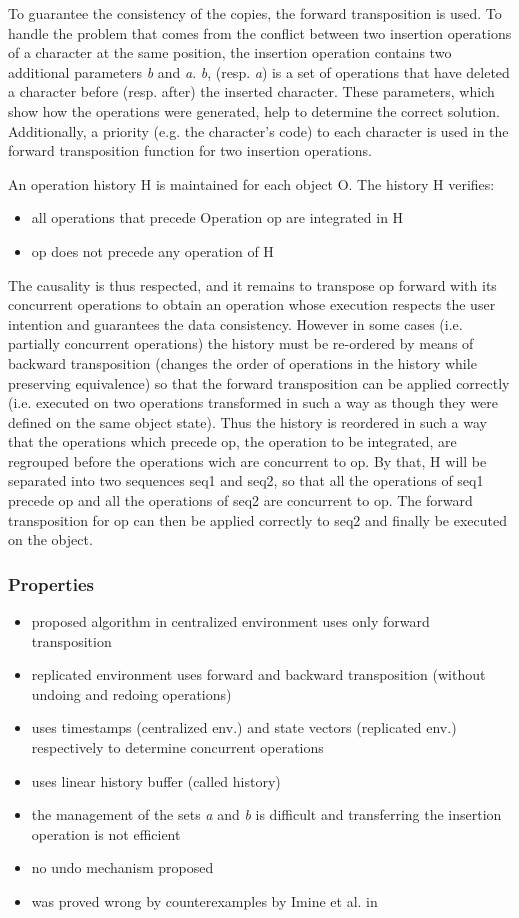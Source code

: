 To guarantee the consistency of the copies, the forward transposition is used. To handle the problem that comes from the conflict between two insertion operations of a character at the same position, the insertion operation contains two additional parameters \emph{b} and \emph{a}. \emph{b}, (resp. \emph{a}) is a set of operations that have deleted a character before (resp. after) the inserted character. These parameters, which show how the operations were generated, help to determine the correct solution. Additionally, a priority (e.g. the character's code) to each character is used in the forward transposition function for two insertion operations.

An operation history H is maintained for each object O. The history H verifies:
\begin{itemize}
 \item all operations that precede Operation op are integrated in H
 \item op does not precede any operation of H
\end{itemize}
The causality is thus respected, and it remains to transpose op forward with its concurrent operations to obtain an operation whose execution respects the user intention and guarantees the data consistency. However in some cases (i.e. partially concurrent operations) the history must be re-ordered by means of backward transposition (changes the order of operations in the history while preserving equivalence) so that the forward transposition can be applied correctly (i.e. executed on two operations transformed in such a way as though they were defined on the same object state). Thus the history is reordered in such a way that the operations which precede op, the operation to be integrated, are regrouped before the operations wich are concurrent to op. By that, H will be separated into two sequences seq1 and seq2, so that all the operations of seq1 precede op and all the operations of seq2 are concurrent to op. The forward transposition for op can then be applied correctly to seq2 and finally be executed on the object.

\subsubsection{Properties}
\begin{itemize}
 \item proposed algorithm in centralized environment uses only forward transposition
 \item replicated environment uses forward and backward transposition (without undoing and redoing operations)
 \item uses timestamps (centralized env.) and state vectors (replicated env.) respectively to determine concurrent operations
 \item uses linear history buffer (called history) 
 \item the management of the sets \emph{a} and \emph{b} is difficult and transferring the insertion operation is not efficient
 \item no undo mechanism proposed
 \item was proved wrong by counterexamples by Imine et al. in \cite{imine04}
\end{itemize}
 